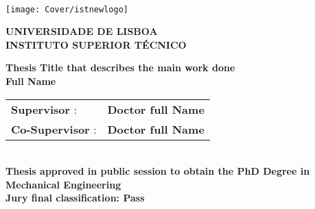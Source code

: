 \setcounter{page}{1} 


\thispagestyle{empty}
\begin{flushleft} ~\\ \vspace{-12mm} \hspace{-12mm}  \texttt{[image: Cover/istnewlogo]}

    \centering
    \LARGE \textbf{UNIVERSIDADE DE LISBOA \\ INSTITUTO SUPERIOR TÉCNICO}
    \vspace{10mm}


    \centering
    \Large \textbf{Thesis Title that describes the main work done}
    \\ \vspace{8mm}  %
    \Large\textbf{Full Name} \\
    \vspace{8mm}

    \Large %
    \begin{minipage}{\textwidth}
        \begin{tabularx}{\textwidth}{ l @{ } l }
            \textbf{Supervisor} :    & \textbf{Doctor full Name} \\
            \textbf{Co-Supervisor} : & \textbf{Doctor full Name} \\
        \end{tabularx}
    \end{minipage}
    \\ \vspace{8mm}
    \centering
    \Large \textbf{Thesis approved in public session to obtain the PhD Degree in}\\
    \Large \textbf{Mechanical Engineering}\\
    \vspace{5mm}
    \Large \textbf{Jury final classification:  Pass}\\


\end{flushleft}
